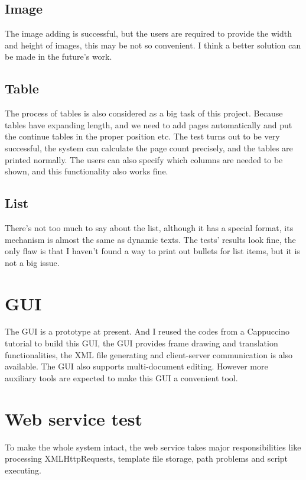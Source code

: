 \documentclass[12pt,twoside,a4paper]{report}
\begin{document}
\subsection{Image}

  The image adding is successful, but the users are required to provide the width and height of images, this may be not so convenient. I think a better solution can be made in the future's work.

\subsection{Table}

  The process of tables is also considered as a big task of this project. Because tables have expanding length, and we need to add pages automatically and put the continue tables in the proper position etc. The test turns out to be very successful, the system can calculate the page count precisely, and the tables are printed normally. The users can also specify which columns are needed to be shown, and this functionality also works fine.

\subsection{List}

  There's not too much to say about the list, although it has a special format, its mechanism is almost the same as dynamic texts. The tests' results look fine, the only flaw is that I haven't found a way to print out bullets for list items, but it is not a big issue.

\section{GUI}

  The GUI is a prototype at present. And I reused the codes from a Cappuccino tutorial to build this GUI, the GUI provides frame drawing and translation functionalities, the XML file generating and client-server communication is also available. The GUI also supports multi-document editing. However more auxiliary tools are expected to make this GUI a convenient tool.

\section{Web service test}

  To make the whole system intact, the web service takes major responsibilities like processing XMLHttpRequests, template file storage, path problems and script executing. 
\end{document}
